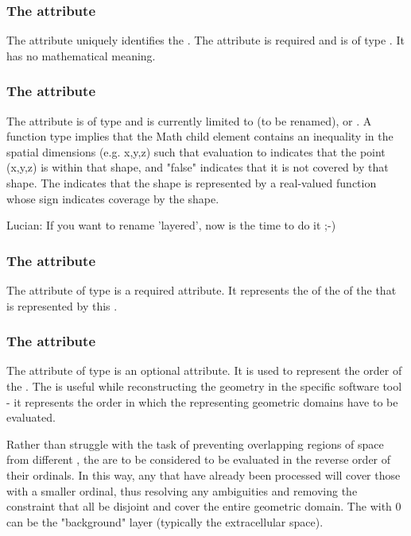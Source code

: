 \subsubsection{The  attribute}
The  attribute uniquely identifies the \AnalyticVolume. The attribute is required and is of type .  It has no mathematical meaning.

\subsubsection{The  attribute}
The  attribute is of type  and is currently limited to  (to be renamed), or .  A  function type implies that the Math child element contains an inequality in the spatial dimensions (e.g. x,y,z) such that evaluation to  indicates that the point (x,y,z) is within that shape, and "false" indicates that it is not covered by that shape.  The   indicates that the shape is represented by a real-valued function whose sign indicates coverage by the shape.

{\color{red} Lucian: \notice If you want to rename 'layered', now is the time to do it ;-)}

\subsubsection{The  attribute}
The  attribute of type  is a required attribute. It represents the  of the \DomainType of the \Domain that is represented by this \AnalyticVolume. 

\subsubsection{The  attribute}
The  attribute of type  is an optional attribute. It is used to represent the order of the \AnalyticVolume. The  is useful while reconstructing the geometry in the specific software tool - it represents the order in which the \AnalyticVolumes representing geometric domains have to be evaluated.

Rather than struggle with the task of preventing overlapping regions of space from different \AnalyticVolumes, the \AnalyticVolumes are to be considered to be evaluated in the reverse order of their ordinals.  In this way, any \AnalyticVolumes that have already been processed will cover those with a smaller ordinal, thus resolving any ambiguities and removing the constraint that all \AnalyticVolumes be disjoint and cover the entire geometric domain.  The \AnalyticVolume with  0 can be the "background" layer (typically the extracellular space).  

